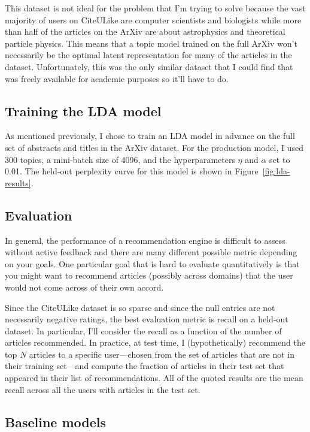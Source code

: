 \documentclass[11pt]{article}
\newcommand{\fig}[1]{Figure~\ref{fig:#1}}
\begin{document}
This dataset is not ideal for the problem that I'm trying to solve because the
vast majority of users on CiteULike are computer scientists and biologists
while more than half of the articles on the ArXiv are about astrophysics and
theoretical particle physics.
This means that a topic model trained on the full ArXiv won't necessarily be
the optimal latent representation for many of the articles in the dataset.
Unfortunately, this was the only similar dataset that I could find that was
freely available for academic purposes so it'll have to do.

\subsection{Training the LDA model}

As mentioned previously, I chose to train an LDA model in advance on the full
set of abstracts and titles in the ArXiv dataset.
For the production model, I used 300 topics, a mini-batch size of 4096, and
the hyperparameters $\eta$ and $\alpha$ set to 0.01.
The held-out perplexity curve for this model is shown in \fig{lda-results}.

\subsection{Evaluation}

In general, the performance of a recommendation engine is difficult to assess
without active feedback and there are many different possible metric depending
on your goals.
One particular goal that is hard to evaluate quantitatively is that you might
want to recommend articles (possibly across domains) that the user would not
come across of their own accord.

Since the CiteULike dataset is so sparse and since the null entries are not
necessarily negative ratings, the best evaluation metric is recall on a
held-out dataset.
In particular, I'll consider the recall as a function of the number of
articles recommended.
In practice, at test time, I (hypothetically) recommend the top $N$ articles
to a specific user---chosen from the set of articles that are not in their
training set---and compute the fraction of articles in their test set that
appeared in their list of recommendations.
All of the quoted results are the mean recall across all the users with
articles in the test set.

\subsection{Baseline models}
\end{document}
